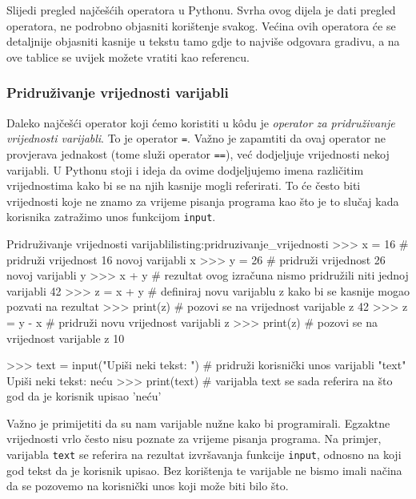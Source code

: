 Slijedi pregled najčešćih operatora u Pythonu. Svrha ovog dijela je dati pregled operatora, ne podrobno objasniti korištenje svakog. Većina ovih operatora će se detaljnije objasniti kasnije u tekstu tamo gdje to najviše odgovara gradivu, a na ove tablice se uvijek možete vratiti kao referencu.

\subsubsection{Pridruživanje vrijednosti varijabli}

Daleko najčešći operator koji ćemo koristiti u kôdu je \emph{operator za pridruživanje vrijednosti varijabli}. To je operator \texttt{=}. Važno je zapamtiti da ovaj operator ne provjerava jednakost (tome služi operator \texttt{==}), već dodjeljuje vrijednosti nekoj varijabli. U Pythonu stoji i ideja da ovime dodjeljujemo imena različitim vrijednostima kako bi se na njih kasnije mogli referirati. To će često biti vrijednosti koje ne znamo za vrijeme pisanja programa kao što je to slučaj kada korisnika zatražimo unos funkcijom \texttt{input}.


\begin{python}{Pridruživanje vrijednosti varijabli}{listing:pridruzivanje_vrijednosti}
>>> x = 16  # pridruži vrijednost 16 novoj varijabli x
>>> y = 26  # pridruži vrijednost 26 novoj varijabli y
>>> x + y  # rezultat ovog izračuna nismo pridružili niti jednoj varijabli
42
>>> z = x + y  # definiraj novu varijablu z kako bi se kasnije mogao pozvati na rezultat
>>> print(z)  # pozovi se na vrijednost varijable z
42
>>> z = y - x  # pridruži novu vrijednost varijabli z
>>> print(z)  # pozovi se na vrijednost varijable z
10

>>> text = input("Upiši neki tekst: ")  # pridruži korisnički unos varijabli "text"
Upiši neki tekst: neću
>>> print(text)  # varijabla text se sada referira na što god da je korisnik upisao
'neću'
\end{python}


Važno je primijetiti da su nam varijable nužne kako bi programirali. Egzaktne vrijednosti vrlo često nisu poznate za vrijeme pisanja programa. Na primjer, varijabla \texttt{text} se referira na rezultat izvršavanja funkcije \texttt{input}, odnosno na koji god tekst da je korisnik upisao. Bez korištenja te varijable ne bismo imali načina da se pozovemo na korisnički unos koji može biti bilo što.



